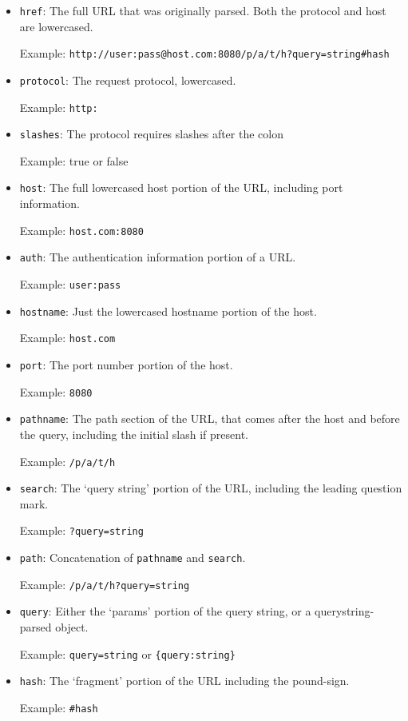 \begin{itemize}
\item
  \texttt{href}: The full URL that was originally parsed. Both the
  protocol and host are lowercased.

  Example:
  \texttt{\textquotesingle{}http://user:pass@host.com:8080/p/a/t/h?query=string\#hash\textquotesingle{}}
\item
  \texttt{protocol}: The request protocol, lowercased.

  Example: \texttt{\textquotesingle{}http:\textquotesingle{}}
\item
  \texttt{slashes}: The protocol requires slashes after the colon

  Example: true or false
\item
  \texttt{host}: The full lowercased host portion of the URL, including
  port information.

  Example: \texttt{\textquotesingle{}host.com:8080\textquotesingle{}}
\item
  \texttt{auth}: The authentication information portion of a URL.

  Example: \texttt{\textquotesingle{}user:pass\textquotesingle{}}
\item
  \texttt{hostname}: Just the lowercased hostname portion of the host.

  Example: \texttt{\textquotesingle{}host.com\textquotesingle{}}
\item
  \texttt{port}: The port number portion of the host.

  Example: \texttt{\textquotesingle{}8080\textquotesingle{}}
\item
  \texttt{pathname}: The path section of the URL, that comes after the
  host and before the query, including the initial slash if present.

  Example: \texttt{\textquotesingle{}/p/a/t/h\textquotesingle{}}
\item
  \texttt{search}: The `query string' portion of the URL, including the
  leading question mark.

  Example: \texttt{\textquotesingle{}?query=string\textquotesingle{}}
\item
  \texttt{path}: Concatenation of \texttt{pathname} and \texttt{search}.

  Example:
  \texttt{\textquotesingle{}/p/a/t/h?query=string\textquotesingle{}}
\item
  \texttt{query}: Either the `params' portion of the query string, or a
  querystring-parsed object.

  Example: \texttt{\textquotesingle{}query=string\textquotesingle{}} or
  \texttt{\{\textquotesingle{}query\textquotesingle{}:\textquotesingle{}string\textquotesingle{}\}}
\item
  \texttt{hash}: The `fragment' portion of the URL including the
  pound-sign.

  Example: \texttt{\textquotesingle{}\#hash\textquotesingle{}}
\end{itemize}

